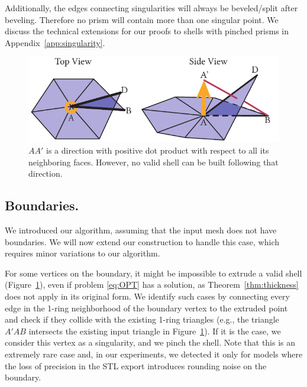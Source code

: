 Additionally, the edges connecting singularities will always be beveled/split after beveling. Therefore no prism will contain more than one singular point.
We discuss the technical extensions for our proofs to shells with pinched prisms in Appendix~\ref{app:singularity}.


\begin{figure}
    \centering
    \includegraphics[width=0.9\linewidth]{prism-tex/figs/boundary_singular}
    \caption{$AA'$ is a direction with positive dot product with respect to all its neighboring faces. However, no valid shell can be built following that direction.}
    \label{prism:fig:boundary_singularity}
    
\end{figure}

\subsection{Boundaries.}\label{prism:sec:boundaries}

We introduced our algorithm, assuming that the input mesh does not have boundaries. We will now extend our construction to handle this case, which requires minor variations to our algorithm.

For some vertices on the boundary, it might be impossible to extrude a valid shell (Figure~\ref{prism:fig:boundary_singularity}), even if problem \eqref{eq:OPT} has a solution, as  Theorem~\ref{thm:thickness} does not apply in its original form. 
%
We identify such cases by connecting every edge in the 1-ring neighborhood of the boundary vertex
to the extruded point and check if they collide with the existing 1-ring triangles (e.g., the triangle $A'AB$ intersects the existing input triangle in Figure~\ref{prism:fig:boundary_singularity}). If it is the case, we consider this vertex as a singularity, and we pinch the shell. Note that this is an extremely rare case and, in our experiments, we detected it only for models where the loss of precision in the STL export introduces rounding noise on the boundary.%

